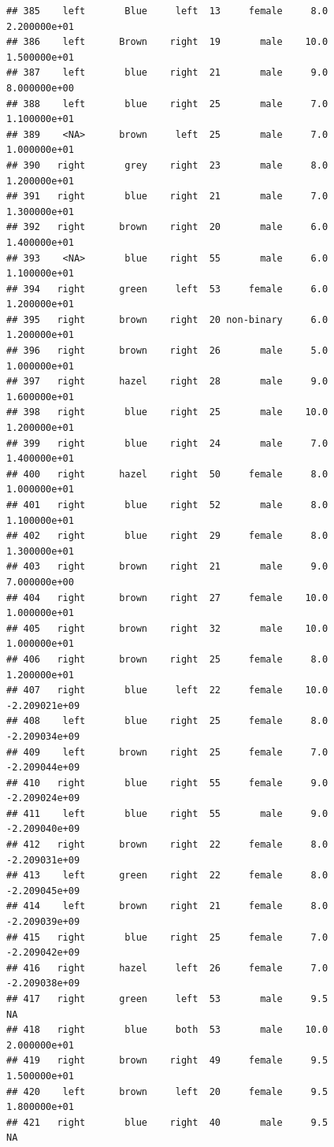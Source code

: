 \documentclass[]{article}
\begin{document}
\begin{verbatim}
## 385    left       Blue     left  13     female     8.0  2.200000e+01
## 386    left      Brown    right  19       male    10.0  1.500000e+01
## 387    left       blue    right  21       male     9.0  8.000000e+00
## 388    left       blue    right  25       male     7.0  1.100000e+01
## 389    <NA>      brown     left  25       male     7.0  1.000000e+01
## 390   right       grey    right  23       male     8.0  1.200000e+01
## 391   right       blue    right  21       male     7.0  1.300000e+01
## 392   right      brown    right  20       male     6.0  1.400000e+01
## 393    <NA>       blue    right  55       male     6.0  1.100000e+01
## 394   right      green     left  53     female     6.0  1.200000e+01
## 395   right      brown    right  20 non-binary     6.0  1.200000e+01
## 396   right      brown    right  26       male     5.0  1.000000e+01
## 397   right      hazel    right  28       male     9.0  1.600000e+01
## 398   right       blue    right  25       male    10.0  1.200000e+01
## 399   right       blue    right  24       male     7.0  1.400000e+01
## 400   right      hazel    right  50     female     8.0  1.000000e+01
## 401   right       blue    right  52       male     8.0  1.100000e+01
## 402   right       blue    right  29     female     8.0  1.300000e+01
## 403   right      brown    right  21       male     9.0  7.000000e+00
## 404   right      brown    right  27     female    10.0  1.000000e+01
## 405   right      brown    right  32       male    10.0  1.000000e+01
## 406   right      brown    right  25     female     8.0  1.200000e+01
## 407   right       blue     left  22     female    10.0 -2.209021e+09
## 408    left       blue    right  25     female     8.0 -2.209034e+09
## 409    left      brown    right  25     female     7.0 -2.209044e+09
## 410   right       blue    right  55     female     9.0 -2.209024e+09
## 411    left       blue    right  55       male     9.0 -2.209040e+09
## 412   right      brown    right  22     female     8.0 -2.209031e+09
## 413    left      green    right  22     female     8.0 -2.209045e+09
## 414    left      brown    right  21     female     8.0 -2.209039e+09
## 415   right       blue    right  25     female     7.0 -2.209042e+09
## 416   right      hazel     left  26     female     7.0 -2.209038e+09
## 417   right      green     left  53       male     9.5            NA
## 418   right       blue     both  53       male    10.0  2.000000e+01
## 419   right      brown    right  49     female     9.5  1.500000e+01
## 420    left      brown     left  20     female     9.5  1.800000e+01
## 421   right       blue    right  40       male     9.5            NA

\end{verbatim}
\end{document}
